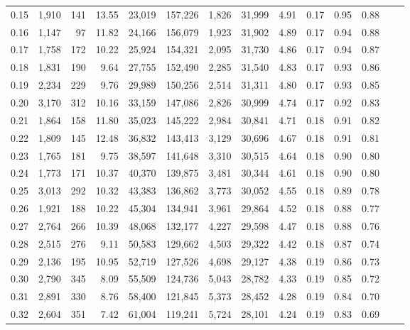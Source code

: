 \begin{tabular}{rrrrrrrrrrrrrr}
0.15 &  1,910 &  141 &   13.55 &   23,019 &  157,226 &   1,826 &  31,999 &  4.91 &  0.17 &  0.95 &      0.88 \\
0.16 &  1,147 &   97 &   11.82 &   24,166 &  156,079 &   1,923 &  31,902 &  4.89 &  0.17 &  0.94 &      0.88 \\
0.17 &  1,758 &  172 &   10.22 &   25,924 &  154,321 &   2,095 &  31,730 &  4.86 &  0.17 &  0.94 &      0.87 \\
0.18 &  1,831 &  190 &    9.64 &   27,755 &  152,490 &   2,285 &  31,540 &  4.83 &  0.17 &  0.93 &      0.86 \\
0.19 &  2,234 &  229 &    9.76 &   29,989 &  150,256 &   2,514 &  31,311 &  4.80 &  0.17 &  0.93 &      0.85 \\
0.20 &  3,170 &  312 &   10.16 &   33,159 &  147,086 &   2,826 &  30,999 &  4.74 &  0.17 &  0.92 &      0.83 \\
0.21 &  1,864 &  158 &   11.80 &   35,023 &  145,222 &   2,984 &  30,841 &  4.71 &  0.18 &  0.91 &      0.82 \\
0.22 &  1,809 &  145 &   12.48 &   36,832 &  143,413 &   3,129 &  30,696 &  4.67 &  0.18 &  0.91 &      0.81 \\
0.23 &  1,765 &  181 &    9.75 &   38,597 &  141,648 &   3,310 &  30,515 &  4.64 &  0.18 &  0.90 &      0.80 \\
0.24 &  1,773 &  171 &   10.37 &   40,370 &  139,875 &   3,481 &  30,344 &  4.61 &  0.18 &  0.90 &      0.80 \\
0.25 &  3,013 &  292 &   10.32 &   43,383 &  136,862 &   3,773 &  30,052 &  4.55 &  0.18 &  0.89 &      0.78 \\
0.26 &  1,921 &  188 &   10.22 &   45,304 &  134,941 &   3,961 &  29,864 &  4.52 &  0.18 &  0.88 &      0.77 \\
0.27 &  2,764 &  266 &   10.39 &   48,068 &  132,177 &   4,227 &  29,598 &  4.47 &  0.18 &  0.88 &      0.76 \\
0.28 &  2,515 &  276 &    9.11 &   50,583 &  129,662 &   4,503 &  29,322 &  4.42 &  0.18 &  0.87 &      0.74 \\
0.29 &  2,136 &  195 &   10.95 &   52,719 &  127,526 &   4,698 &  29,127 &  4.38 &  0.19 &  0.86 &      0.73 \\
0.30 &  2,790 &  345 &    8.09 &   55,509 &  124,736 &   5,043 &  28,782 &  4.33 &  0.19 &  0.85 &      0.72 \\
0.31 &  2,891 &  330 &    8.76 &   58,400 &  121,845 &   5,373 &  28,452 &  4.28 &  0.19 &  0.84 &      0.70 \\
0.32 &  2,604 &  351 &    7.42 &   61,004 &  119,241 &   5,724 &  28,101 &  4.24 &  0.19 &  0.83 &      0.69 \\

\end{tabular}
